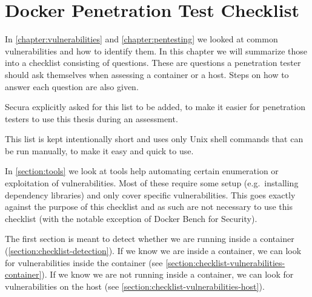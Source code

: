 \chapter{Docker Penetration Test Checklist}\label{chapter:checklist}
In \autoref{chapter:vulnerabilities} and \autoref{chapter:pentesting} we looked at common vulnerabilities and how to identify them. In this chapter we will summarize those into a checklist consisting of questions. These are questions a penetration tester should ask themselves when assessing a container or a host. Steps on how to answer each question are also given.

Secura explicitly asked for this list to be added, to make it easier for penetration testers to use this thesis during an assessment.

\medskip

This list is kept intentionally short and uses only Unix shell commands that can be run manually, to make it easy and quick to use.

In \autoref{section:tools} we look at tools help automating certain enumeration or exploitation of vulnerabilities. Most of these require some setup (e.g.\ installing dependency libraries) and only cover specific vulnerabilities. This goes exactly against the purpose of this checklist and as such are not necessary to use this checklist (with the notable exception of Docker Bench for Security).

\medskip

The first section is meant to detect whether we are running inside a container (\autoref{section:checklist-detection}). If we know we are inside a container, we can look for vulnerabilities inside the container (see \autoref{section:checklist-vulnerabilities-container}). If we know we are not running inside a container, we can look for vulnerabilities on the host (see \autoref{section:checklist-vulnerabilities-host}).





